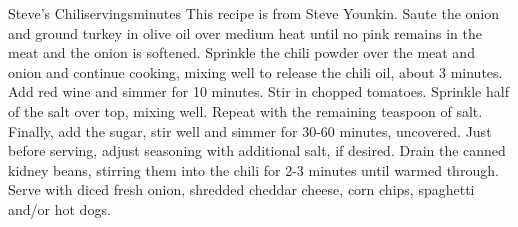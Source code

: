 \begin{recipe}{Steve's Chili}{\unit[6]{servings}}{\unit[90]{minutes}}
\freeform This recipe is from Steve Younkin. 
Saute the onion and ground turkey in olive oil over medium heat until no pink remains in the meat and the onion is softened. Sprinkle the chili powder over the meat and onion and continue cooking, mixing well to release the chili oil, about 3 minutes.
Add red wine and simmer for 10 minutes. Stir in chopped tomatoes. Sprinkle half of the salt over top, mixing well. Repeat with the remaining teaspoon of salt. Finally, add the sugar, stir well and simmer for 30-60 minutes, uncovered. Just before serving, adjust seasoning with additional salt, if desired. Drain the canned kidney beans, stirring them into the chili for 2-3 minutes until warmed through. Serve with diced fresh onion, shredded cheddar cheese, corn chips, spaghetti and/or hot dogs.
\end{recipe}